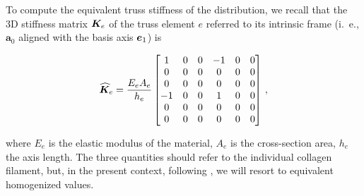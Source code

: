 \documentclass[preprint,12pt]{elsarticle}
\newcommand{\mbs}[1]{\boldsymbol{#1}}
\def\ba{{\mbs{a}}} \def\bb{{\mbs{b}}} \def\bc{{\mbs{c}}}
\begin{document}
To compute the equivalent truss stiffness of the distribution, we recall that the 3D stiffness matrix $\bK_e$ of the truss element $e$ referred to its intrinsic frame (i.~e., $\ba_0$ aligned with the basis axis $\be_1$) is 
\begin{linenomath}
\begin{equation}
   \widehat{\bK}_e
   =
   \dfrac{E_e A_e}{h_e}
	   \begin{bmatrix}
		  1 & 0 & 0 & -1 & 0 & 0\\
		  0 & 0 & 0 &  0 & 0 & 0\\
		  0 & 0 & 0 &  0 & 0 & 0\\
		 -1 & 0 & 0 &  1 & 0 & 0\\
		  0 & 0 & 0 &  0 & 0 & 0\\
		  0 & 0 & 0 &  0 & 0 & 0 
	\end{bmatrix}
    \, ,
    \label{truss1}
\end{equation}
\end{linenomath}
where $E_e$ is the elastic modulus of the material, $A_e$ is the cross-section area, $h_e$ the axis length. The three quantities should refer to the individual collagen filament, but, in the present context, following \cite{pandolfi:2019}, we will resort to equivalent homogenized values.
\end{document}
